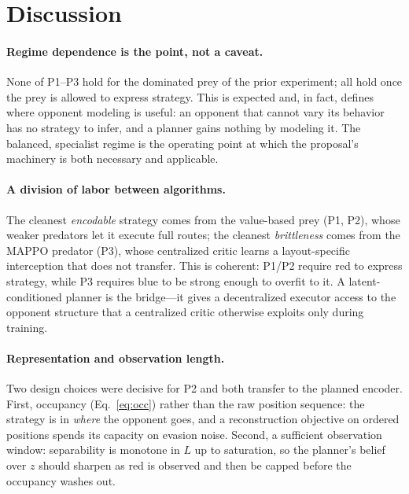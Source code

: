 \documentclass[11pt]{article}
\newcommand{\zlat}{z}
\begin{document}
\section{Discussion}

\paragraph{Regime dependence is the point, not a caveat.}
None of P1--P3 hold for the dominated prey of the prior experiment; all hold once
the prey is allowed to express strategy. This is expected and, in fact, defines
where opponent modeling is useful: an opponent that cannot vary its behavior has
no strategy to infer, and a planner gains nothing by modeling it. The balanced,
specialist regime is the operating point at which the proposal's machinery is
both necessary and applicable.

\paragraph{A division of labor between algorithms.}
The cleanest \emph{encodable} strategy comes from the value-based prey (P1, P2),
whose weaker predators let it execute full routes; the cleanest
\emph{brittleness} comes from the MAPPO predator (P3), whose centralized critic
learns a layout-specific interception that does not transfer. This is coherent:
P1/P2 require red to express strategy, while P3 requires blue to be strong enough
to overfit to it. A latent-conditioned planner is the bridge---it gives a
decentralized executor access to the opponent structure that a centralized critic
otherwise exploits only during training.

\paragraph{Representation and observation length.}
Two design choices were decisive for P2 and both transfer to the planned encoder.
First, occupancy (Eq.~\ref{eq:occ}) rather than the raw position sequence: the
strategy is in \emph{where} the opponent goes, and a reconstruction objective on
ordered positions spends its capacity on evasion noise. Second, a sufficient
observation window: separability is monotone in $L$ up to saturation, so the
planner's belief over $\zlat$ should sharpen as red is observed and then be
capped before the occupancy washes out.


\end{document}
